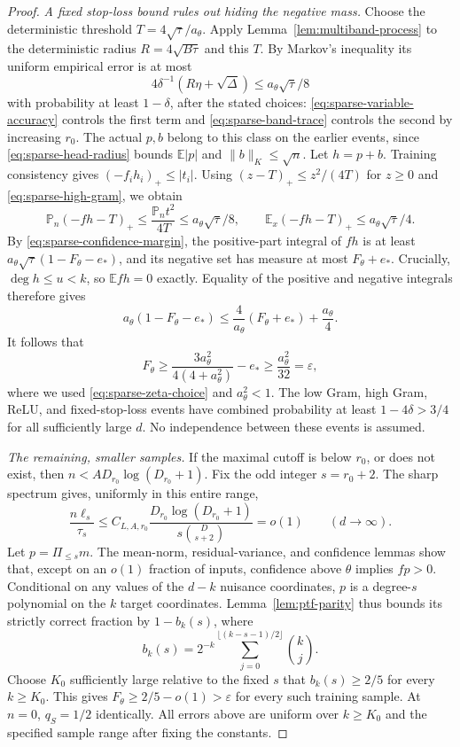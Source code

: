 \begin{proof}
\medskip\noindent
\emph{A fixed stop-loss bound rules out hiding the negative mass.}
Choose the deterministic threshold
$T=4\sqrt\tau/a_\theta$.
Apply Lemma~\ref{lem:multiband-process} to the deterministic radius
$R=4\sqrt{B\tau}$ and this $T$.
By Markov's inequality its uniform empirical error is at most
\[
 4\delta^{-1}(R\eta+\sqrt\Delta)
 \le a_\theta\sqrt\tau/8
\]
with probability at least $1-\delta$, after the stated choices:
\eqref{eq:sparse-variable-accuracy} controls the first term and
\eqref{eq:sparse-band-trace} controls the second by increasing $r_0$.
The actual $p,b$ belong to this class on the earlier events, since
\eqref{eq:sparse-head-radius} bounds $\mathbb E|p|$ and
$\|b\|_K\le\sqrt n$.
Let $h=p+b$. Training consistency gives $(-f_i h_i)_+\le|t_i|$.
Using $(z-T)_+\le z^2/(4T)$ for $z\ge0$ and
\eqref{eq:sparse-high-gram}, we obtain
\[
 \mathbb P_n(-fh-T)_+
 \le\frac{\mathbb P_n t^2}{4T}
 \le a_\theta\sqrt\tau/8,
 \qquad
 \mathbb E_x(-fh-T)_+\le a_\theta\sqrt\tau/4.
\]
By \eqref{eq:sparse-confidence-margin}, the positive-part integral of
$fh$ is at least
$a_\theta\sqrt\tau(1-F_\theta-e_*)$, and its negative set has measure
at most $F_\theta+e_*$. Crucially, $\deg h\le u<k$, so
$\mathbb E fh=0$ exactly. Equality of the positive and negative
integrals therefore gives
\[
 a_\theta(1-F_\theta-e_*)
 \le\frac4{a_\theta}(F_\theta+e_*)+\frac{a_\theta}4.
\]
It follows that
\[
 F_\theta\ge\frac{3a_\theta^2}{4(4+a_\theta^2)}-e_*
             \ge\frac{a_\theta^2}{32}=\varepsilon,
\]
where we used \eqref{eq:sparse-zeta-choice} and $a_\theta^2<1$.
The low Gram, high Gram, ReLU, and fixed-stop-loss events have combined
probability at least $1-4\delta>3/4$ for all sufficiently large $d$.
No independence between these events is assumed.

\medskip\noindent
\emph{The remaining, smaller samples.}
If the maximal cutoff is below $r_0$, or does not exist, then
$n<A D_{r_0}\log(D_{r_0}+1)$. Fix the odd integer $s=r_0+2$.
The sharp spectrum gives, uniformly in this entire range,
\[
 \frac{n\ell_s}{\tau_s}
 \le C_{L,A,r_0}\frac{D_{r_0}\log(D_{r_0}+1)}
                           {s\binom D{s+2}}=o(1)
 \qquad(d\to\infty).
\]
Let $p=\Pi_{\le s}m$. The mean-norm, residual-variance, and confidence
lemmas show that, except on an $o(1)$ fraction of inputs, confidence
above $\theta$ implies $fp>0$. Conditional on any values of the
$d-k$ nuisance coordinates, $p$ is a degree-$s$ polynomial on the
$k$ target coordinates. Lemma~\ref{lem:ptf-parity} thus bounds its
strictly correct fraction by $1-b_k(s)$, where
\[
 b_k(s)=2^{-k}\sum_{j=0}^{\lfloor(k-s-1)/2\rfloor}\binom kj.
\]
Choose $K_0$ sufficiently large relative to the fixed $s$ that
$b_k(s)\ge2/5$ for every $k\ge K_0$.
This gives $F_\theta\ge2/5-o(1)>\varepsilon$ for every such training
sample. At $n=0$, $q_S=1/2$ identically.
All errors above are uniform over $k\ge K_0$ and the specified sample
range after fixing the constants.


\end{proof}
